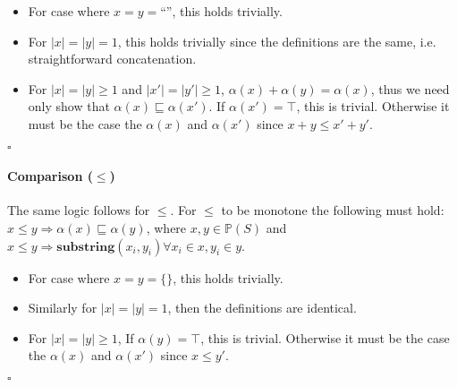 \documentclass{article}
\newcommand{\powerset}[1]{\mathbb{P}(#1)}
\begin{document}
\begin{itemize}
	\item For case where $x = y = \text{``''}$, this holds trivially.
	\item For $|x| = |y| = 1$, this holds trivially since the definitions are the same, i.e. straightforward concatenation.
	\item For $|x| = |y| \geq 1$ and $|x'| = |y'| \geq 1$, $\alpha(x) + \alpha(y) = \alpha(x)$, thus we need only show that $\alpha(x) \sqsubseteq \alpha(x')$.  If $\alpha(x') = \top$, this is trivial. Otherwise it must be the case the $\alpha(x)$ and $\alpha(x')$ since $x + y \leq x' + y'$.
\end{itemize}
$\square$

\paragraph{Comparison ($\leq$)}
The same logic follows for $\leq$. For $\leq$ to be monotone the following must hold: $x \leq y \Rightarrow  \alpha(x) \sqsubseteq \alpha(y)$, where $x,y \in \powerset{S}$ and $x \leq y \Rightarrow \mathbf{substring}(x_i,y_i) \forall x_i \in x, y_i \in y$.
\begin{itemize}
	\item For case where $x = y = \{\}$, this holds trivially.
	\item Similarly for $|x| = |y| = 1$, then the definitions are identical.
	\item For $|x| = |y| \geq 1$, If $\alpha(y) = \top$, this is trivial. Otherwise it must be the case the $\alpha(x)$ and $\alpha(x')$ since $x \leq y'$.
\end{itemize}
$\square$
\end{document}
